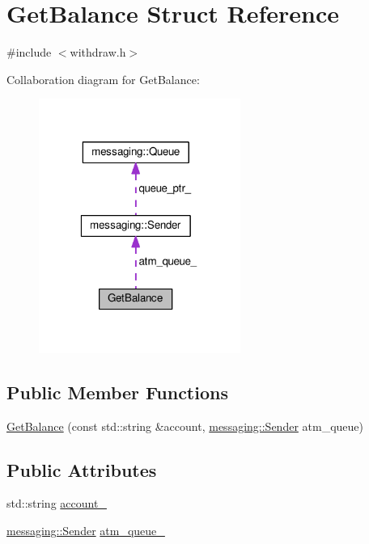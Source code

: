 \hypertarget{structGetBalance}{\section{Get\-Balance Struct Reference}
\label{structGetBalance}
}


{\ttfamily \#include $<$withdraw.\-h$>$}



Collaboration diagram for Get\-Balance\-:
\nopagebreak
\begin{figure}[H]
\begin{center}
\leavevmode
\includegraphics[width=187pt]{structGetBalance__coll__graph}
\end{center}
\end{figure}
\subsection*{Public Member Functions}
\begin{DoxyCompactItemize}
\item 
\hyperlink{structGetBalance_a3c9b1bdf591755a52784b97de5ffd866}{Get\-Balance} (const std\-::string \&account, \hyperlink{classmessaging_1_1Sender}{messaging\-::\-Sender} atm\-\_\-queue)
\end{DoxyCompactItemize}
\subsection*{Public Attributes}
\begin{DoxyCompactItemize}
\item 
std\-::string \hyperlink{structGetBalance_a75b798e4035cf6468cc359db6ba0a4e9}{account\-\_\-}
\item 
\hyperlink{classmessaging_1_1Sender}{messaging\-::\-Sender} \hyperlink{structGetBalance_a469a494592b15655be79bc85c7202750}{atm\-\_\-queue\-\_\-}
\end{DoxyCompactItemize}


